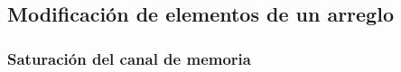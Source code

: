  \subsection{Modificación de elementos de un arreglo}
    \subsubsection{Saturación del canal de memoria}